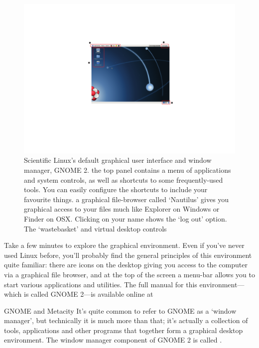 \begin{figure}[t]
\centerline{\includegraphics[width=16cm]{images/gnome-desktop}}
\caption{Scientific Linux's default graphical user interface and
  window manager, GNOME 2. \protect{} the top panel contains
  a menu of applications and system controls, as well as shortcuts to
  some frequently-used tools. You can easily configure the shortcuts
  to include your favourite things. \protect{} a graphical
  file-browser called `Nautilus' gives you graphical access to your
  files much like Explorer on Windows or Finder on
  OSX. \protect{} Clicking on your name shows the `log out'
  option. \protect{} The `wastebasket' and virtual desktop
  controls}\label{figure:gnome-desktop}
\end{figure}

Take a few minutes to explore the graphical environment. Even if you've never used Linux before, you'll probably find the general principles of this environment quite familiar: there are icons on the desktop giving you access to the computer via a graphical file browser, and at the top of the screen a menu-bar allows you to start various applications and utilities. The full manual for this environment---which is called GNOME 2---is available online at 

\noindent{}

\begin{linux}{GNOME and Metacity}
It's quite common to refer to GNOME as a `window manager', but technically it is much more than that; it's actually a collection of tools, applications and other programs that together form a graphical desktop environment. The window manager component of GNOME 2 is called .
\end{linux} 

